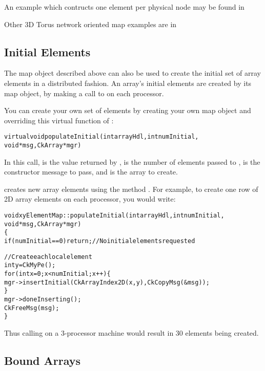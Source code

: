 An example which contructs one element per physical node may be found in

Other 3D Torus network oriented map examples are in

\subsection{Initial Elements}
\label{array initial}

The map object described above can also be used to create
the initial set of array elements in a distributed fashion.
An array's initial elements are created by its map object,
by making a call to  on each processor.

You can create your own set of elements by creating your
own map object and overriding this virtual function of :

\begin{alltt}
  virtual void populateInitial(int arrayHdl,int numInitial,
	void *msg,CkArray *mgr)
\end{alltt}

In this call,  is the value returned by ,
 is the number of elements passed to ,
 is the constructor message to pass, and  is the
array to create.

 creates new array elements using the method
.
For example, to create one row of 2D array elements on each processor,
you would write:

\begin{alltt}
void xyElementMap::populateInitial(int arrayHdl,int numInitial,
	void *msg,CkArray *mgr)
\{
  if (numInitial==0) return; //No initial elements requested
	
  //Create each local element
  int y=CkMyPe();
  for (int x=0;x<numInitial;x++) \{
    mgr->insertInitial(CkArrayIndex2D(x,y),CkCopyMsg(&msg));
  \}
  mgr->doneInserting();
  CkFreeMsg(msg);
\}
\end{alltt}

Thus calling  on a 3-processor machine would result in
30 elements being created.


\subsection{Bound Arrays}
 
\label{bound arrays}

